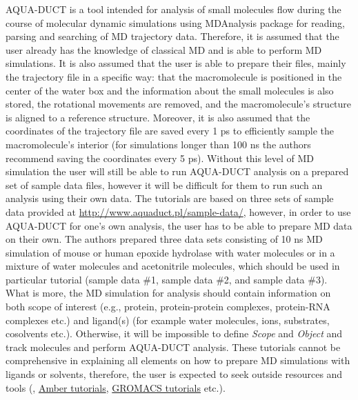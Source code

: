 \documentclass[9pt,tutorial, pubversion]{livecoms}
\begin{document}
AQUA-DUCT is a tool intended for analysis of small molecules flow during the course of molecular dynamic simulations using MDAnalysis \cite{Michaud-Agrawal2011} package for reading, parsing and searching of MD trajectory data. Therefore, it is
assumed that the user already has the knowledge of classical MD and is able to perform MD simulations. It is also assumed that the user is able to prepare their files, mainly the trajectory file in a specific way: that the macromolecule is positioned in the center of the water box and the information about the small molecules is also stored, the rotational movements are removed, and the macromolecule's structure is aligned to a reference structure. Moreover, it is also assumed that the coordinates of the trajectory file are saved every 1 ps to efficiently sample the macromolecule's interior (for simulations longer than 100 ns the authors recommend saving the coordinates every 5 ps). Without this level of MD simulation the user will still be able to run AQUA-DUCT analysis on a prepared set of sample data files, however it will be difficult for them to run such an analysis using their own data.
The tutorials are based on three sets of sample data provided at  \url{http://www.aquaduct.pl/sample-data/}, however, in order to use  AQUA-DUCT for one’s own analysis, the user has to be able to prepare MD data on their own. The authors prepared three data sets consisting of 10 ns MD simulation of mouse or human epoxide hydrolase with water molecules or in a mixture of water molecules and acetonitrile molecules, which should be used in particular tutorial (sample data \#1, sample data \#2, and sample data \#3). What is more, the MD simulation for analysis should contain information on both scope of interest (e.g., protein, protein-protein complexes, protein-RNA complexes etc.) and ligand(s) (for example water molecules, ions, substrates, cosolvents etc.). Otherwise, it will be impossible to define \textit{Scope} and \textit{Object} and track molecules and perform AQUA-DUCT analysis. These tutorials cannot be comprehensive in explaining all elements on how to prepare MD simulations with ligands or solvents, therefore, the user is expected to seek outside resources and tools (\cite{Mitusinska2020}, \href{https://ambermd.org/tutorials/}{Amber tutorials}, \href{http://www.mdtutorials.com/gmx/}{GROMACS tutorials} etc.). 
\end{document}
